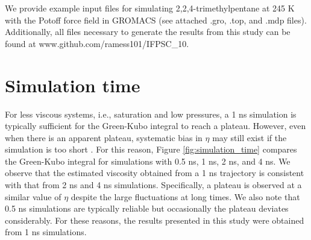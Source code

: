 \documentclass[preprint,review,12pt]{elsarticle}
\begin{document}
	We provide example input files for simulating 2,2,4-trimethylpentane at 245 K with the Potoff force field in GROMACS (see attached .gro, .top, and .mdp files). Additionally, all files necessary to generate the results from this study can be found at \newline www.github.com/ramess101/IFPSC\_10.
	
%	
		
	\section{Simulation time} \label{SI:Simulation time}
	
	
	For less viscous systems, i.e., saturation and low pressures, a 1 ns simulation is typically sufficient for the Green-Kubo integral to reach a plateau. However, even when there is an apparent plateau, systematic bias in $\eta$ may still exist if the simulation is too short \cite{Maginn2018,Zhang2015}. For this reason, Figure \ref{fig:simulation_time} compares the Green-Kubo integral for simulations with 0.5 ns, 1 ns, 2 ns, and 4 ns. We observe that the estimated viscosity obtained from a 1 ns trajectory is consistent with that from 2 ns and 4 ns simulations. Specifically, a plateau is observed at a similar value of $\eta$ despite the large fluctuations at long times. We also note that 0.5 ns simulations are typically reliable but occasionally the plateau deviates considerably. For these reasons, the results presented in this study were obtained from 1 ns simulations.
	
\end{document}
